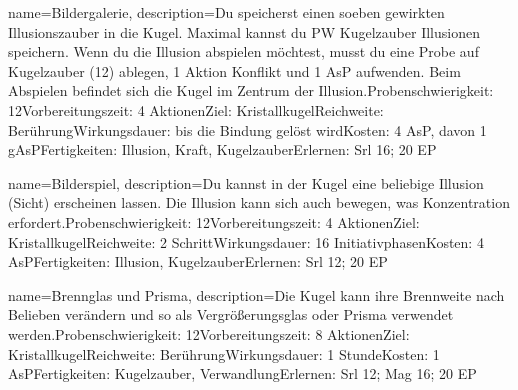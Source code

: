 {
    name={Bildergalerie},
    description={Du speicherst einen soeben gewirkten Illusionszauber in die Kugel. Maximal kannst du PW Kugelzauber Illusionen speichern. Wenn du die Illusion abspielen möchtest, musst du eine Probe auf Kugelzauber (12) ablegen, 1 Aktion Konflikt und 1 AsP aufwenden. Beim Abspielen befindet sich die Kugel im Zentrum der Illusion.\newline Probenschwierigkeit: 12\newline Vorbereitungszeit: 4 Aktionen\newline Ziel: Kristallkugel\newline Reichweite: Berührung\newline Wirkungsdauer: bis die Bindung gelöst wird\newline Kosten: 4 AsP, davon 1 gAsP\newline Fertigkeiten: Illusion, Kraft, Kugelzauber\newline Erlernen: Srl 16; 20 EP}
}


{
    name={Bilderspiel},
    description={Du kannst in der Kugel eine beliebige Illusion (Sicht) erscheinen lassen. Die Illusion kann sich auch bewegen, was Konzentration erfordert.\newline Probenschwierigkeit: 12\newline Vorbereitungszeit: 4 Aktionen\newline Ziel: Kristallkugel\newline Reichweite: 2 Schritt\newline Wirkungsdauer: 16 Initiativphasen\newline Kosten: 4 AsP\newline Fertigkeiten: Illusion, Kugelzauber\newline Erlernen: Srl 12; 20 EP}
}


{
    name={Brennglas und Prisma},
    description={Die Kugel kann ihre Brennweite nach Belieben verändern und so als Vergrößerungsglas oder Prisma verwendet werden.\newline Probenschwierigkeit: 12\newline Vorbereitungszeit: 8 Aktionen\newline Ziel: Kristallkugel\newline Reichweite: Berührung\newline Wirkungsdauer: 1 Stunde\newline Kosten: 1 AsP\newline Fertigkeiten: Kugelzauber, Verwandlung\newline Erlernen: Srl 12; Mag 16; 20 EP}
}


